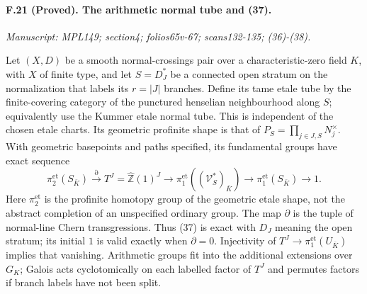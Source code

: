 \paragraph{F.21 (Proved). The arithmetic
normal tube and (37).}
\textit{Manuscript: MPL149; section4; folios65v-67; scans132-135; (36)-(38).}

Let $(X,D)$ be a smooth normal-crossings pair over a characteristic-zero
field $K$, with $X$ of finite type, and let $S=D_J^*$ be a connected
open stratum on the normalization that labels its $r=|J|$ branches.
Define its tame etale tube by the finite-covering category of the
punctured henselian neighbourhood along $S$; equivalently use the
Kummer etale normal tube. This is independent of the chosen etale
charts. Its geometric profinite shape is that of
$P_S=\prod_{j\in J,S}N_j^\times$. With geometric basepoints and
paths specified, its fundamental groups have exact sequence
\[
 \pi_2^{\mathrm{et}}(S_{\bar K})
 \xrightarrow{\partial}
 T^J=\widehat{\mathbb Z}(1)^J
 \longrightarrow\pi_1^{\mathrm{et}}((\mathcal V_S^*)_{\bar K})
 \longrightarrow\pi_1^{\mathrm{et}}(S_{\bar K})\longrightarrow1.
\]
Here $\pi_2^{\mathrm{et}}$ is the profinite homotopy group of the
geometric etale shape, not the abstract completion of an unspecified
ordinary group. The map $\partial$ is the tuple of normal-line Chern
transgressions. Thus (37) is exact with $D_J$ meaning the open stratum;
its initial $1$ is valid exactly when $\partial=0$. Injectivity of
$T^J\to\pi_1^{\mathrm{et}}(U_{\bar K})$ implies that vanishing.
Arithmetic groups fit into the additional extensions over $G_K$;
Galois acts cyclotomically on each labelled factor of $T^J$ and
permutes factors if branch labels have not been split.

